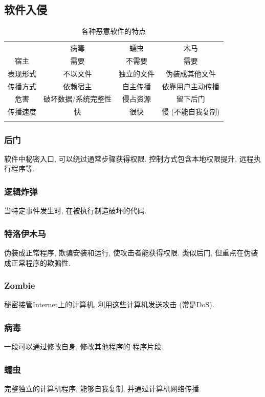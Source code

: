 \documentclass{ctexart}
\newlength{\Oldarrayrulewidth}
\newcommand{\Hline}[1]{
  \noalign{\global\setlength{\Oldarrayrulewidth}{\arrayrulewidth}}
  \noalign{\global\setlength{\arrayrulewidth}{#1}}\hline
  \noalign{\global\setlength{\arrayrulewidth}{\Oldarrayrulewidth}}}
\newcommand{\Topline}{\Hline{0.08em}}
\newcommand{\Bottomline}{\Hline{0.08em}}
\newcommand{\Midline}{\Hline{0.05em}}
\begin{document}
\subsection{软件入侵}
    \begin{table}[ht!]
        \centering
    \begin{tabularx}{\textwidth}{|C|C|C|C|}
        \Topline
                &           病毒 &              蠕虫 &          木马 \\
        \Midline
        宿主    &           需要 &            不需要 &          需要 \\
        \Midline
        表现形式 &          不以文件 &      独立的文件 &    伪装成其他文件\\
        \Midline
        传播方式 &  依赖宿主    &           自主传播 &          依靠用户主动传播\\
        \Midline
        危害 &      破坏数据/系统完整性 &   侵占资源 &      留下后门 \\
        \Midline
        传播速度 &          快 &            很快    &       慢 (不能自我复制)\\
        \Bottomline
    \end{tabularx}
        \caption{各种恶意软件的特点}
    \end{table}
\subsubsection{后门}
    软件中秘密入口, 可以绕过通常步骤获得权限.
    控制方式包含本地权限提升, 远程执行程序等.
\subsubsection{逻辑炸弹}
    当特定事件发生时, 在被执行制造破坏的代码.
\subsubsection{特洛伊木马}
    伪装成正常程序, 欺骗安装和运行, 使攻击者能获得权限.
    类似后门, 但重点在伪装成正常程序的欺骗性.
\subsubsection{Zombie}
    秘密接管Internet上的计算机, 利用这些计算机发送攻击 (常是DoS).
\subsubsection{病毒}
    一段可以通过修改自身, 修改其他程序的 程序片段.
\subsubsection{蠕虫}
    完整独立的计算机程序, 能够自我复制, 并通过计算机网络传播.
\end{document}
